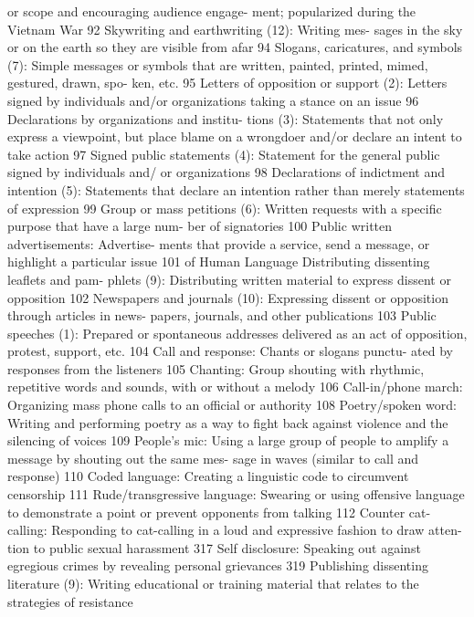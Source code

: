 \documentclass[twoside,a4paper,12pt,fleqn,openany]{extbook}
\begin{document}
or scope and encouraging audience engage-
ment; popularized during the Vietnam War 92
Skywriting and earthwriting (12): Writing mes-
sages in the sky or on the earth so they are
visible from afar
 94
Slogans, caricatures, and symbols (7):
Simple messages or symbols that are written,
painted, printed, mimed, gestured, drawn, spo-
ken, etc.
 95
Letters of opposition or support (2): Letters
signed by individuals and/or organizations
taking a stance on an issue
 96
Declarations by organizations and institu-
tions (3): Statements that not only express a
viewpoint, but place blame on a wrongdoer
and/or declare an intent to take action
 97
Signed public statements (4): Statement for
the general public signed by individuals and/
or organizations
 98
Declarations of indictment and intention (5):
Statements that declare an intention rather
than merely statements of expression
 99
Group or mass petitions (6): Written requests
with a specific purpose that have a large num-
ber of signatories
 100
Public written advertisements: Advertise-
ments that provide a service, send a message,
or highlight a particular issue
 101
of Human Language
Distributing dissenting leaflets and pam-
phlets (9): Distributing written material to
express dissent or opposition
 102
Newspapers and journals (10): Expressing
dissent or opposition through articles in news-
papers, journals, and other publications 103
Public speeches (1): Prepared or spontaneous
addresses delivered as an act of opposition,
protest, support, etc.
 104
Call and response: Chants or slogans punctu-
ated by responses from the listeners
 105
Chanting: Group shouting with rhythmic,
repetitive words and sounds, with or without a
melody
 106
Call-in/phone march: Organizing mass phone
calls to an official or authority
 108
Poetry/spoken word: Writing and performing
poetry as a way to fight back against violence
and the silencing of voices
 109
People’s mic: Using a large group of people to
amplify a message by shouting out the same mes-
sage in waves (similar to call and response) 110
Coded language: Creating a linguistic code to
circumvent censorship
 111
Rude/transgressive language: Swearing or
using offensive language to demonstrate a
point or prevent opponents from talking 112
Counter cat-calling: Responding to cat-calling
in a loud and expressive fashion to draw atten-
tion to public sexual harassment
 317
Self disclosure: Speaking out against egregious
crimes by revealing personal grievances 319
Publishing dissenting literature (9): Writing
educational or training material that relates to
the strategies of resistance
\end{document}
